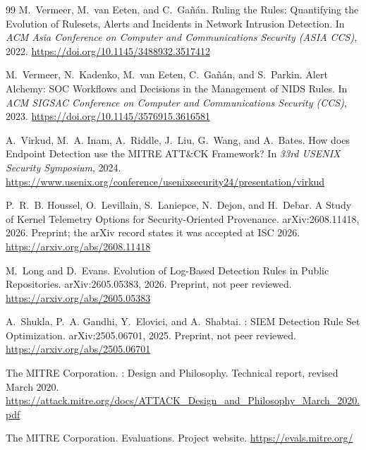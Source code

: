 \documentclass[11pt,a4paper]{article}
\begin{document}
\begin{thebibliography}{99}
M.~Vermeer, M.~van Eeten, and C.~Ga\~n\'an.
\newblock Ruling the Rules: Quantifying the Evolution of Rulesets, Alerts and
  Incidents in Network Intrusion Detection.
\newblock In \emph{ACM Asia Conference on Computer and Communications Security
  (ASIA CCS)}, 2022.
\newblock \url{https://doi.org/10.1145/3488932.3517412}

M.~Vermeer, N.~Kadenko, M.~van Eeten, C.~Ga\~n\'an, and S.~Parkin.
\newblock Alert Alchemy: {SOC} Workflows and Decisions in the Management of
  {NIDS} Rules.
\newblock In \emph{ACM SIGSAC Conference on Computer and Communications
  Security (CCS)}, 2023.
\newblock \url{https://doi.org/10.1145/3576915.3616581}

A.~Virkud, M.~A. Inam, A.~Riddle, J.~Liu, G.~Wang, and A.~Bates.
\newblock How does Endpoint Detection use the {MITRE ATT\&CK} Framework?
\newblock In \emph{33rd USENIX Security Symposium}, 2024.
\newblock \url{https://www.usenix.org/conference/usenixsecurity24/presentation/virkud}


P.~R.~B. Houssel, O.~Levillain, S.~Laniepce, N.~Dejon, and H.~Debar.
\newblock A Study of Kernel Telemetry Options for Security-Oriented
  Provenance.
\newblock arXiv:2608.11418, 2026. Preprint; the arXiv record states it was
  accepted at ISC 2026.
\newblock \url{https://arxiv.org/abs/2608.11418}

M.~Long and D.~Evans.
\newblock Evolution of Log-Based Detection Rules in Public Repositories.
\newblock arXiv:2605.05383, 2026. Preprint, not peer reviewed.
\newblock \url{https://arxiv.org/abs/2605.05383}

A.~Shukla, P.~A. Gandhi, Y.~Elovici, and A.~Shabtai.
: {SIEM} Detection Rule Set Optimization.
\newblock arXiv:2505.06701, 2025. Preprint, not peer reviewed.
\newblock \url{https://arxiv.org/abs/2505.06701}


The MITRE Corporation.
: Design and Philosophy.
\newblock Technical report, revised March 2020.
\newblock \url{https://attack.mitre.org/docs/ATTACK_Design_and_Philosophy_March_2020.pdf}

The MITRE Corporation.
 Evaluations.
\newblock Project website.
\newblock \url{https://evals.mitre.org/}


\end{thebibliography}
\end{document}
